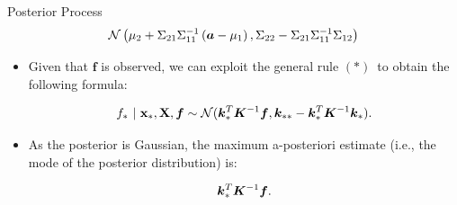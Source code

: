 \begin{frame}[c,allowframebreaks]{Posterior Process}
$$
\mathcal{N}\left(\mu_2 + \Sigma_{21} \Sigma_{11}^{-1}\left(\bm{a} - \mu_1\right), \Sigma_{22} - \Sigma_{21}\Sigma_{11}^{-1}\Sigma_{12} \right)
$$


\framebreak


\begin{itemize}

\item Given that $\bm{f}$ is observed, we can exploit the general rule ${(*)}\,$ to obtain the following formula: 

\begin{eqnarray*}
f_* ~|~ \mathbf{x}_*, \mathbf{X}, \bm{f} \sim \mathcal{N}(\bm{k}_{*}^{T}\bm{K}^{-1}\bm{f}, \bm{k}_{**} - \bm{k}_*^T \bm{K} ^{-1}\bm{k}_*).
\end{eqnarray*}

\lz
\lz

\item As the posterior is Gaussian, the maximum a-posteriori estimate (i.e., the mode of the posterior distribution) is:

\large $$\bm{k}_{*}^{T}\bm{K}^{-1}\bm{f}.$$

\end{itemize}
\end{frame}
